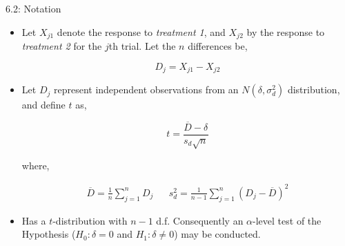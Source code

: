\documentclass[8pt]{beamer}
\begin{document}
    \begin{frame}{6.2: Notation}
    \begin{itemize}
        
        \item Let $X_{j1}$ denote the response to \textit{treatment 1}, and $X_{j2}$ by the response to \textit{treatment 2} for the $j$th trial. Let the $n$ differences be, 
    
      \begin{equation}
        D_{j} = X_{j1} - X_{j2}
      \end{equation}
    
        \item Let $D_{j}$ represent independent observations from an $N(\delta, \sigma_{d}^{2})$ distribution, and define $t$ as,  
        
        \begin{equation}
            t = \frac{\overline{D} - \delta}{s_{d}\sqrt{n}}
        \end{equation}
    
        where,
      
      \begin{align*}
          \overline{D} = \frac{1}{n}\sum_{j=1}^{n}D_{j} && s_{d}^{2} = \frac{1}{n-1}\sum_{j = 1}^{n}(D_{j} - \overline{D})^{2}
      \end{align*}
      
      \item Has a $t$-distribution with $n - 1$ d.f. Consequently an $\alpha$-level test of the Hypothesis ($H_{0}:\delta = 0$ and $H_{1}:\delta \neq 0$) may be conducted. 
     
    \end{itemize}
    \end{frame}
\end{document}
